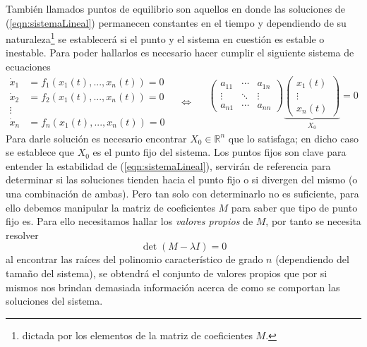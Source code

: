 También llamados puntos de equilibrio son aquellos en donde las soluciones de (\ref{eqn:sistemaLineal}) permanecen constantes en el tiempo y dependiendo de su naturaleza\footnote{dictada por los elementos de la matriz de coeficientes $M$.} se establecerá si el punto y el sistema en cuestión es estable o inestable. Para poder hallarlos es necesario hacer cumplir el siguiente sistema de ecuaciones
\begin{equation*}
	\begin{split}
		\dot{x}_1 &= f_1(x_1(t),...,x_n(t))=0\\
		\dot{x}_2 &= f_2(x_1(t),...,x_n(t))=0\\
		\vdots\\
		\dot{x}_n &= f_n(x_1(t),...,x_n(t))=0
	\end{split}
	\quad\Longleftrightarrow\quad
	\begin{split}
		\begin{pmatrix}
			a_{11} & \cdots & a_{1n}\\
			\vdots & \ddots & \vdots\\
			a_{n1} & \cdots & a_{nn}
		\end{pmatrix}
		\underbrace{\begin{pmatrix}
				x_1(t)\\
				\vdots\\
				x_n(t)
		\end{pmatrix}}_{X_0}=0
	\end{split}
\end{equation*}
Para darle solución es necesario encontrar $X_0\in\mathbb{R}^n$ que lo satisfaga; en dicho caso se establece que $X_0$ es el punto fijo del sistema. Los puntos fijos son clave para entender la estabilidad de (\ref{eqn:sistemaLineal}), servirán de referencia para determinar si las soluciones tienden hacia el punto fijo o si divergen del mismo (o una combinación de ambas). Pero tan solo con determinarlo no es suficiente, para ello debemos manipular la matriz de coeficientes $M$ para saber que tipo de punto fijo es. Para ello necesitamos hallar los \textit{valores propios} de $M$, por tanto se necesita resolver
\begin{equation}\label{eqn:vPropios}
	\det(M-\lambda I)=0
\end{equation}
al encontrar las raíces del polinomio característico de grado $n$ (dependiendo del tamaño del sistema), se obtendrá el conjunto de valores propios que por si mismos nos brindan demasiada información acerca de como se comportan las soluciones del sistema.


